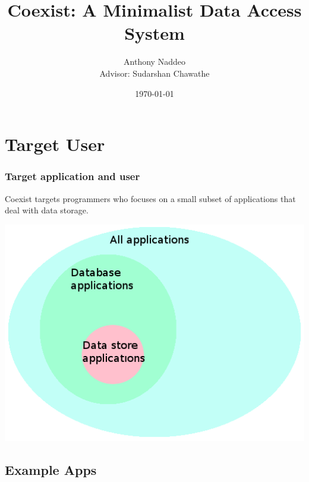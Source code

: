 \documentclass[]{beamer}
\title[]{Coexist: A Minimalist Data Access System}
\author[]{Anthony Naddeo \\ Advisor: Sudarshan Chawathe}
\date{\today}
\begin{document}
\begin{frame}
\titlepage

\end{frame}



\section{Target User}

\begin{frame}
\frametitle{Target application and user}

Coexist targets programmers who focuses on a small subset of applications that
deal with data storage.

\begin{center}
\includegraphics[width=.8\linewidth]{images/app_class.png}
\end{center}
\end{frame}


\subsection{Example Apps}
\end{document}
